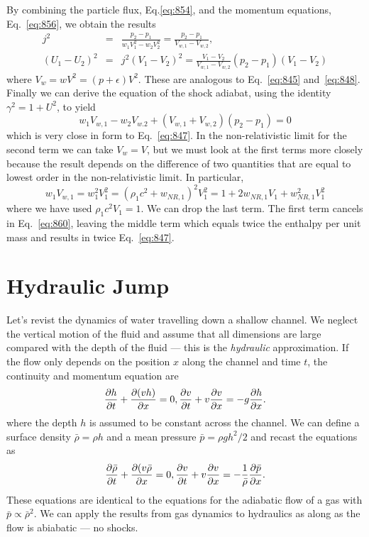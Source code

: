 By combining the particle flux, Eq.\ref{eq:854}, and the momentum
equations, Eq.~\ref{eq:856}, we obtain the results
\begin{eqnarray}
j^2 &=& \frac{p_2-p_1}{w_1 V_1^2 - w_2 V_2^2} = \frac{p_2-p_1}{V_{w,1} - V_{w,2}}, 
\label{eq:859}
\\
\left( U_1 - U_2 \right )^2 &=&
j^2 \left( V_1 - V_2 \right )^2  =  \frac{V_1-V_2} {V_{w,1}-V_{w,2}}
\left (p_2 - p_1 \right ) \left ( V_1 - V_2 \right )
\label{eq:857}
\end{eqnarray}
where $V_w = w V^2=(p + \epsilon ) V^2$.  These are analogous to
Eq.~\ref{eq:845} and~\ref{eq:848}.  Finally we can derive the equation
of the shock adiabat, using the identity $\gamma^2 = 1 + U^2$, to
yield
\begin{equation}
  w_1 V_{w,1} - w_2 V_{w.2} + \left( V_{w,1} + V_{w,2} \right ) \left (p_2 - p_1 \right ) = 0
\label{eq:860}
\end{equation}
which is very close in form to Eq.~\ref{eq:847}.  In the
non-relativistic limit for the second term we can take $V_w=V$,
but we must look at the first terms more closely because the result
depends on the difference of two quantities that are equal to lowest
order in the non-relativistic limit.  In particular,
\begin{equation}
w_1 V_{w,1} = w_1^2 V_1^2 = \left ( \rho_1 c^2 + w_{NR,1} \right )^2
V_1^2 = 1 + 2 w_{NR,1} V_1 + w_{NR,1}^2 V_1^2
\label{eq:861}
\end{equation}
where we have used $\rho_1 c^2 V_1=1$.  We can drop the last term.
The first term cancels in Eq.~\ref{eq:860}, leaving the middle term
which equals twice the enthalpy per unit mass and results in
twice Eq.~\ref{eq:847}.

\section{Hydraulic Jump}
\label{sec:hydraulic-jump}
Let's revist the dynamics of water travelling down a shallow channel.
We neglect the vertical motion of the fluid and assume that all
dimensions are large compared with the depth of the fluid --- this is the
{\em hydraulic} approximation.  If the flow only depends on the
position $x$ along the channel and time $t$, the continuity and
momentum equation are
\begin{equation}
\frac{\partial {h}}{\partial {t}} + \frac{\partial {(vh)}}{\partial {x}} = 0, \frac{\partial {v}}{\partial {t}} + v \frac{\partial {v}}{\partial {x}} = -g \frac{\partial {h}}{\partial {x}}.
\label{eq:862}
\end{equation}
where the depth $h$ is assumed to be constant across the channel.  We
can define a surface density ${\bar \rho} = \rho h$ and a mean
pressure ${\bar p}=\rho g h^2/2$ and recast the equations as
\begin{equation}
\frac{\partial {\bar \rho}}{\partial {t}} + \frac{\partial {(v {\bar \rho}}}{\partial {x}} = 0, \frac{\partial {v}}{\partial {t}} + v \frac{\partial {v}}{\partial {x}} =
-\frac{1}{\bar \rho} \frac{\partial {\bar p}}{\partial {x}}.
\label{eq:862}
\end{equation}
These equations are identical to the equations for the adiabatic flow
of a gas with $\bar p \propto \bar \rho^2$.  We can apply the results
from gas dynamics to hydraulics as along as the flow is abiabatic ---
no shocks.


